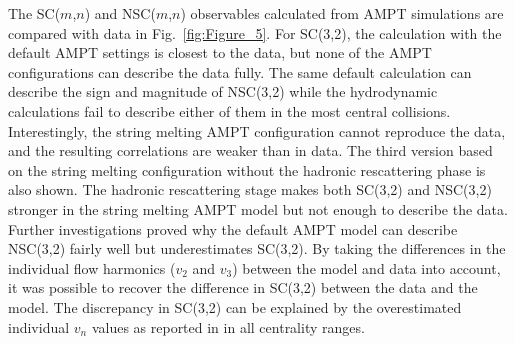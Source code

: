 
The SC($m$,$n$) and NSC($m$,$n$) observables calculated from AMPT simulations are compared with data in Fig.~\ref{fig:Figure_5}.
For SC(3,2), the calculation with the default AMPT settings is closest to the data, but none of the AMPT configurations can describe the data fully. 
The same default calculation can describe the sign and magnitude of NSC(3,2) while the hydrodynamic calculations fail to describe either of them in the most central collisions.
Interestingly, the string melting AMPT configuration cannot reproduce the data, and the resulting correlations are weaker than in data.
The third version based on the string melting configuration without the hadronic rescattering phase is also shown.
The hadronic rescattering stage makes both SC(3,2) and NSC(3,2) stronger in the string melting AMPT model but not enough to describe the data.
Further investigations proved why the default AMPT model can describe NSC(3,2) fairly well but underestimates SC(3,2). By taking the differences in the individual flow harmonics ($v_2$ and $v_3$) between the model and data into account, it was possible to recover the difference in SC(3,2) between the data and the model. The discrepancy in SC(3,2) can be explained by the overestimated individual $v_n$ values as reported in \cite{Adam:2016nfo} in all centrality ranges. 

